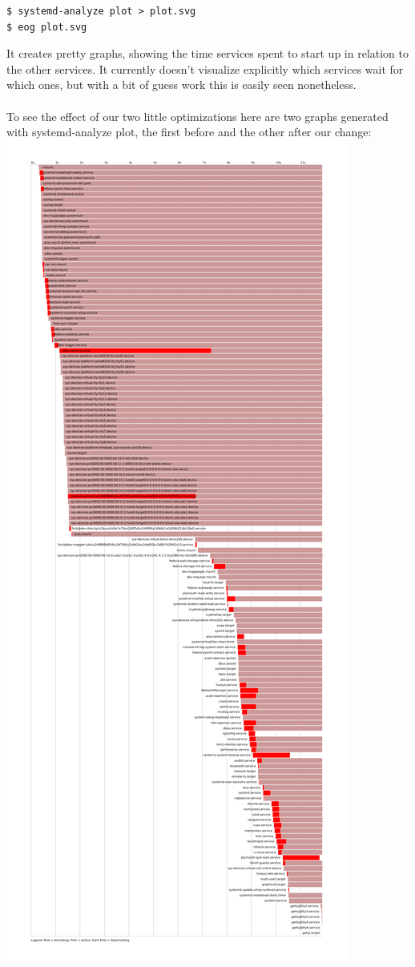 \documentclass[titlepage]{article}
\begin{document}
\begin{lstlisting}
$ systemd-analyze plot > plot.svg
$ eog plot.svg
\end{lstlisting}
It creates pretty graphs, showing the time services spent to start up in relation to the other services. It currently doesn't visualize explicitly which services wait for which ones, but with a bit of guess work this is easily seen nonetheless.
\\
\\
To see the effect of our two little optimizations here are two graphs generated with systemd-analyze plot, the first before and the other after our change:
\includegraphics[scale=0.1]{blame.png}
\end{document}
